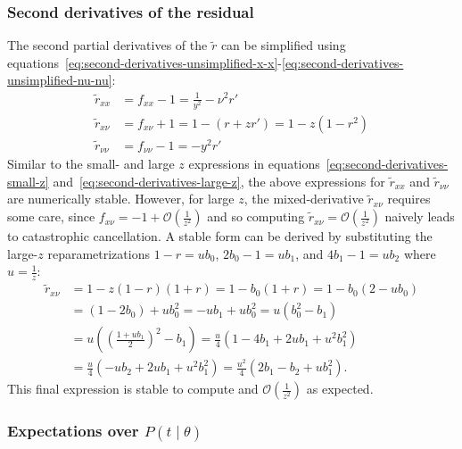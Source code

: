 \documentclass{article}
\begin{document}
\subsubsection{Second derivatives of the residual}\label{sec:second-derivatives-residual}

The second partial derivatives of the $\tilde{r}$ can be simplified using equations~\eqref{eq:second-derivatives-unsimplified-x-x}-\eqref{eq:second-derivatives-unsimplified-nu-nu}:
%
\begin{align}
  \tilde{r}_{xx}     & = f_{xx} - 1     = \frac{1}{y^2} - \nu^2 r'        \\
  \tilde{r}_{x\nu}   & = f_{x\nu} + 1   = 1 - (r + z r') = 1 - z(1 - r^2) \\
  \tilde{r}_{\nu\nu} & = f_{\nu\nu} - 1 = - y^2 r'
\end{align}
%
Similar to the small- and large $z$ expressions in equations~\eqref{eq:second-derivatives-small-z} and~\eqref{eq:second-derivatives-large-z}, the above expressions for $\tilde{r}_{xx}$ and $\tilde{r}_{\nu\nu}$ are numerically stable.
However, for large $z$, the mixed-derivative $\tilde{r}_{x\nu}$ requires some care, since $f_{x\nu} = -1 + \mathcal{O}(\frac{1}{z^2})$ and so computing $\tilde{r}_{x\nu} = \mathcal{O}(\frac{1}{z^2})$ naively leads to catastrophic cancellation.
A stable form can be derived by substituting the large-$z$ reparametrizations $1 - r = u b_0$, $2 b_0 - 1 = u b_1$, and $4 b_1 - 1 = u b_2$ where $u = \frac{1}{z}$:
%
\begin{align}
  \tilde{r}_{x\nu} & = 1 - z(1 - r)(1 + r) = 1 - b_0 (1 + r) = 1 - b_0(2 - u b_0)                       \\
                   & = (1 - 2 b_0) + u b_0^2 = -u b_1 + u b_0^2 = u (b_0^2 - b_1)                       \\
                   & = u ((\frac{1 + u b_1}{2})^2 - b_1) = \frac{u}{4} (1 - 4b_1 + 2u b_1 + u^2 b_1^2)  \\
                   & = \frac{u}{4}(-u b_2 + 2u b_1 + u^2 b_1^2) = \frac{u^2}{4}(2 b_1 - b_2 + u b_1^2).
\end{align}
%
This final expression is stable to compute and $\mathcal{O}(\frac{1}{z^2})$ as expected.

\subsubsection{Expectations over $P(t \mid \theta)$}
\end{document}
